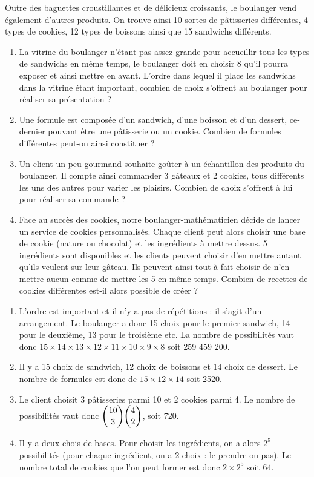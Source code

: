 \documentclass[11pt,fleqn, openany]{book} %
\begin{document}
\begin{exercise}Outre des baguettes croustillantes et de délicieux croissants, le boulanger vend également d'autres produits. On trouve ainsi 10 sortes de pâtisseries différentes, 4 types de cookies, 12 types de boissons ainsi que 15 sandwichs différents.

\begin{enumerate}
\item La vitrine du boulanger n'étant pas assez grande pour accueillir tous les types de sandwichs en même temps, le boulanger doit en choisir 8 qu'il pourra exposer et ainsi mettre en avant.  L'ordre dans lequel il place les sandwichs dans la vitrine étant important, combien de choix s'offrent au boulanger pour réaliser sa présentation ?
\item Une formule est composée d'un sandwich, d'une boisson et d'un dessert, ce-dernier pouvant être une pâtisserie ou un cookie. Combien de formules différentes peut-on ainsi constituer ?
\item Un client un peu gourmand souhaite goûter à un échantillon des produits du boulanger. Il compte ainsi commander 3 gâteaux et 2 cookies, tous différents les uns des autres pour varier les plaisirs. Combien de choix s'offrent à lui pour réaliser sa commande ?
\item Face au succès des cookies, notre boulanger-mathématicien décide de lancer un service de cookies personnalisés. Chaque client peut alors choisir une base de cookie (nature ou chocolat) et les ingrédients à mettre dessus. 5 ingrédients sont disponibles et les clients peuvent choisir d'en mettre autant qu'ils veulent sur leur gâteau. Ils peuvent ainsi tout à fait choisir de n'en mettre aucun comme de mettre les 5 en même temps. Combien de recettes de cookies différentes est-il alors possible de créer ?
\end{enumerate}\end{exercise}

\begin{solution}\begin{enumerate}
\item L'ordre est important et il n'y a pas de répétitions : il s'agit d'un arrangement. Le boulanger a donc 15 choix pour le premier sandwich, 14 pour le deuxième, 13 pour le troisième etc. La nombre de possibilités vaut donc $15 \times 14 \times 13 \times 12 \times 11 \times 10 \times 9 \times 8$ soit 259 459 200. 
\item Il y a 15 choix de sandwich, 12 choix de boissons et 14 choix de dessert. Le nombre de formules est donc de $15 \times 12 \times 14$ soit 2520.
\item Le client choisit 3 pâtisseries parmi 10 et 2 cookies parmi 4. Le nombre de possibilités vaut donc $\dbinom{10}{3} \dbinom{4}{2}$, soit 720.
\item Il y a deux chois de bases. Pour choisir les ingrédients, on a alors $2^5$ possibilités (pour chaque ingrédient, on a 2 choix : le prendre ou pas). Le nombre total de cookies que l'on peut former est donc $2  \times 2^5$ soit 64. 
\end{enumerate}
\end{solution}
\end{document}
